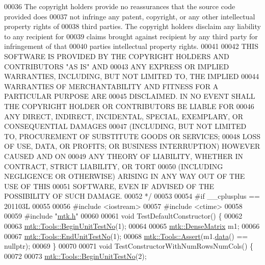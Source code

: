 \begin{DoxyCode}
00036 \textcolor{comment}{The copyright holders provide no reassurances that the source code provided does}
00037 \textcolor{comment}{not infringe any patent, copyright, or any other intellectual property rights of}
00038 \textcolor{comment}{third parties. The copyright holders disclaim any liability to any recipient for}
00039 \textcolor{comment}{claims brought against recipient by any third party for infringement of that}
00040 \textcolor{comment}{parties intellectual property rights.}
00041 \textcolor{comment}{}
00042 \textcolor{comment}{THIS SOFTWARE IS PROVIDED BY THE COPYRIGHT HOLDERS AND CONTRIBUTORS "AS IS" AND}
00043 \textcolor{comment}{ANY EXPRESS OR IMPLIED WARRANTIES, INCLUDING, BUT NOT LIMITED TO, THE IMPLIED}
00044 \textcolor{comment}{WARRANTIES OF MERCHANTABILITY AND FITNESS FOR A PARTICULAR PURPOSE ARE}
00045 \textcolor{comment}{DISCLAIMED. IN NO EVENT SHALL THE COPYRIGHT HOLDER OR CONTRIBUTORS BE LIABLE FOR}
00046 \textcolor{comment}{ANY DIRECT, INDIRECT, INCIDENTAL, SPECIAL, EXEMPLARY, OR CONSEQUENTIAL DAMAGES}
00047 \textcolor{comment}{(INCLUDING, BUT NOT LIMITED TO, PROCUREMENT OF SUBSTITUTE GOODS OR SERVICES;}
00048 \textcolor{comment}{LOSS OF USE, DATA, OR PROFITS; OR BUSINESS INTERRUPTION) HOWEVER CAUSED AND ON}
00049 \textcolor{comment}{ANY THEORY OF LIABILITY, WHETHER IN CONTRACT, STRICT LIABILITY, OR TORT}
00050 \textcolor{comment}{(INCLUDING NEGLIGENCE OR OTHERWISE) ARISING IN ANY WAY OUT OF THE USE OF THIS}
00051 \textcolor{comment}{SOFTWARE, EVEN IF ADVISED OF THE POSSIBILITY OF SUCH DAMAGE.}
00052 \textcolor{comment}{*/}
00053 
00054 \textcolor{preprocessor}{#if \_\_cplusplus == 201103L}
00055 
00056 \textcolor{preprocessor}{#include <iostream>}
00057 \textcolor{preprocessor}{#include <ctime>}
00058 
00059 \textcolor{preprocessor}{#include "\hyperlink{mtk_8h}{mtk.h}"}
00060 
00061 \textcolor{keywordtype}{void} TestDefaultConstructor() \{
00062 
00063   \hyperlink{classmtk_1_1Tools_a26ee906d28523378522a75e25c3a4e19}{mtk::Tools::BeginUnitTestNo}(1);
00064 
00065   \hyperlink{classmtk_1_1DenseMatrix}{mtk::DenseMatrix} m1;
00066 
00067   \hyperlink{classmtk_1_1Tools_ad8cf0085133dd40c913fe195bc5b9694}{mtk::Tools::EndUnitTestNo}(1);
00068   \hyperlink{classmtk_1_1Tools_aa311fada9255627d06c56b1e4fedce9e}{mtk::Tools::Assert}(m1.\hyperlink{classmtk_1_1DenseMatrix_a16b3ff56feb2658b9fc7147d1de4d8e7}{data}() == \textcolor{keyword}{nullptr});
00069 \}
00070 
00071 \textcolor{keywordtype}{void} TestConstructorWithNumRowsNumCols() \{
00072 
00073   \hyperlink{classmtk_1_1Tools_a26ee906d28523378522a75e25c3a4e19}{mtk::Tools::BeginUnitTestNo}(2);

\end{DoxyCode}
